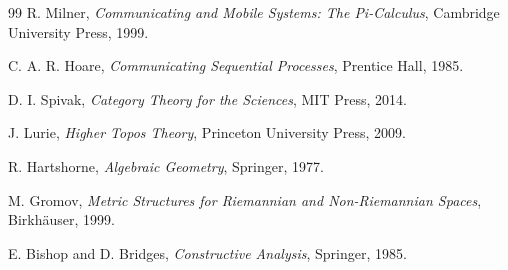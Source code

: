 \documentclass[11pt,oneside]{article}
\begin{document}
\begin{thebibliography}{99}
R. Milner,
\textit{Communicating and Mobile Systems: The Pi-Calculus},
Cambridge University Press, 1999.

C. A. R. Hoare,
\textit{Communicating Sequential Processes},
Prentice Hall, 1985.

D. I. Spivak,
\textit{Category Theory for the Sciences},
MIT Press, 2014.

J. Lurie,
\textit{Higher Topos Theory},
Princeton University Press, 2009.

R. Hartshorne,
\textit{Algebraic Geometry},
Springer, 1977.

M. Gromov,
\textit{Metric Structures for Riemannian and Non-Riemannian Spaces},
Birkhäuser, 1999.

E. Bishop and D. Bridges,
\textit{Constructive Analysis},
Springer, 1985.

\end{thebibliography}
\end{document}
